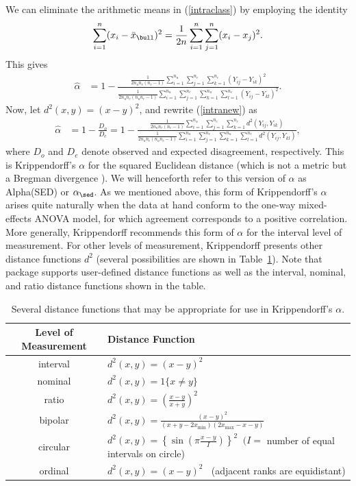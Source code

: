 We can eliminate the arithmetic means in (\ref{intraclass}) by employing the identity
\[
\sum_{i=1}^n(x_i-\bar{x}_\bull)^2=\frac{1}{2n}\sum_{i=1}^n\sum_{j=1}^n(x_i-x_j)^2.
\]
This gives
\begin{align}
\label{intranew}
\hat{\alpha}&=1-\frac{\frac{1}{2n_un_c(n_c-1)}\sum_{i=1}^{n_u}\sum_{j=1}^{n_c}\sum_{k=1}^{n_c}(Y_{ij}-Y_{ik})^2}{\frac{1}{2n_un_c(n_un_c-1)}\sum_{i=1}^{n_u}\sum_{j=1}^{n_c}\sum_{k=1}^{n_u}\sum_{l=1}^{n_c}(Y_{ij}-Y_{kl})^2}.
\end{align}
Now, let $d^2(x,y)=(x-y)^2$, and rewrite (\ref{intranew}) as
\begin{align}
\label{sed}
\hat{\alpha}&=1-\frac{D_o}{D_e}=1-\frac{\frac{1}{2n_un_c(n_c-1)}\sum_{i=1}^{n_u}\sum_{j=1}^{n_c}\sum_{k=1}^{n_c}d^2(Y_{ij},Y_{ik})}{\frac{1}{2n_un_c(n_un_c-1)}\sum_{i=1}^{n_u}\sum_{j=1}^{n_c}\sum_{k=1}^{n_u}\sum_{l=1}^{n_c}d^2(Y_{ij},Y_{kl})},
\end{align}
where $D_o$ and $D_e$ denote observed and expected disagreement, respectively. This is Krippendorff's $\alpha$ for the squared Euclidean distance (which is not a metric but a Bregman divergence \citep{bregman}). We will henceforth refer to this version of $\alpha$ as Alpha(SED) or $\alpha_\sed$. As we mentioned above, this form of Krippendorff's $\alpha$ arises quite naturally when the data at hand conform to the one-way mixed-effects ANOVA model, for which agreement corresponds to a positive correlation. More generally, Krippendorff recommends this form of $\alpha$ for the interval level of measurement. For other levels of measurement, Krippendorff presents other distance functions $d^2$ (several possibilities are shown in Table~\ref{distance}). Note that package  supports user-defined distance functions as well as the interval, nominal, and ratio distance functions shown in the table.
\begin{table}[h]
   \centering
   \begin{tabular}{cl}
      Level of Measurement   & Distance Function \\\hline
     interval & $d^2(x,y)=(x-y)^2$\\
      nominal & $d^2(x,y)=1\{x\neq y\}$\\
      ratio & $d^2(x,y)=\left(\frac{x-y}{x+y}\right)^2$\\
      bipolar & $d^2(x,y)=\frac{(x-y)^2}{(x+y-2x_\text{min})(2x_\text{max}-x-y)}$\\
      circular & $d^2(x,y)=\left\{\sin\left(\pi\frac{x-y}{I}\right)\right\}^2\;\;(I=$ number of equal intervals on circle)\\
      ordinal & $d^2(x,y)=(x-y)^2\;\;$ (adjacent ranks are equidistant)
         \end{tabular}
   \caption{Several distance functions that may be appropriate for use in Krippendorff's $\alpha$.}
   \label{distance}
\end{table}


